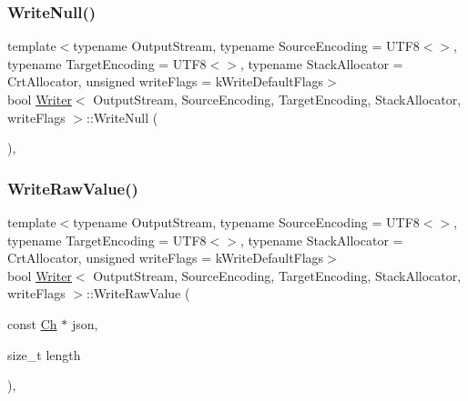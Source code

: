 \subsubsection{\texorpdfstring{Write\+Null()}{WriteNull()}}
{\footnotesize\ttfamily template$<$typename Output\+Stream, typename Source\+Encoding = U\+T\+F8$<$$>$, typename Target\+Encoding = U\+T\+F8$<$$>$, typename Stack\+Allocator = Crt\+Allocator, unsigned write\+Flags = k\+Write\+Default\+Flags$>$ \\
bool \hyperlink{classWriter}{Writer}$<$ Output\+Stream, Source\+Encoding, Target\+Encoding, Stack\+Allocator, write\+Flags $>$\+::Write\+Null (\begin{DoxyParamCaption}{ }\end{DoxyParamCaption})\hspace{0.3cm}{\ttfamily [inline]}, {\ttfamily [protected]}}

\mbox{\label{classWriter_a8ee1135b2595261819b134907f67614e}} 
\subsubsection{\texorpdfstring{Write\+Raw\+Value()}{WriteRawValue()}}
{\footnotesize\ttfamily template$<$typename Output\+Stream, typename Source\+Encoding = U\+T\+F8$<$$>$, typename Target\+Encoding = U\+T\+F8$<$$>$, typename Stack\+Allocator = Crt\+Allocator, unsigned write\+Flags = k\+Write\+Default\+Flags$>$ \\
bool \hyperlink{classWriter}{Writer}$<$ Output\+Stream, Source\+Encoding, Target\+Encoding, Stack\+Allocator, write\+Flags $>$\+::Write\+Raw\+Value (\begin{DoxyParamCaption}\item[{const \hyperlink{classWriter_ab08bff5fd2daec65f4a78779ca3d2139}{Ch} $\ast$}]{json,  }\item[{size\+\_\+t}]{length }\end{DoxyParamCaption})\hspace{0.3cm}{\ttfamily [inline]}, {\ttfamily [protected]}}

\mbox{\label{classWriter_a3c3560a96cac58f98f4a74d6cb227204}} 
